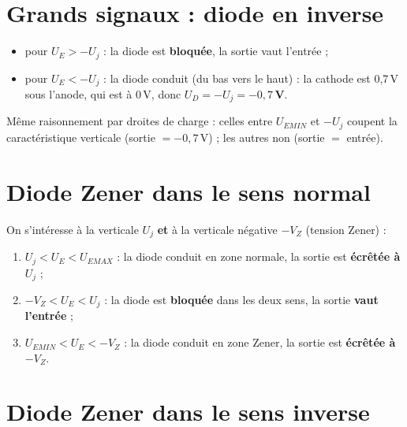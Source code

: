\section{Grands signaux : diode en inverse}


\begin{propbox}[title={Diode montée en inverse (la caractéristique pivote de 180\ensuremath{^\circ})}]
\begin{itemize}
  \item pour $U_E > -U_j$ : la diode est \textbf{bloquée}, la sortie vaut l'entrée ;
  \item pour $U_E < -U_j$ : la diode conduit (du bas vers le haut) : la cathode est 0,7\,V
        sous l'anode, qui est à 0\,V, donc \textbf{$U_D = -U_j = -0{,}7$\,V}.
\end{itemize}
Même raisonnement par droites de charge : celles entre $U_{EMIN}$ et $-U_j$ coupent la
caractéristique verticale (sortie $= -0{,}7$\,V) ; les autres non (sortie $=$ entrée).
\end{propbox}

\section{Diode Zener dans le sens normal}


\begin{thmbox}[title={Zener, sens normal : trois zones}]
On s'intéresse à la verticale $U_j$ \textbf{et} à la verticale négative $-V_Z$ (tension
Zener) :
\begin{enumerate}
  \item $U_j < U_E < U_{EMAX}$ : la diode conduit en zone \og normale\fg{}, la sortie est
        \textbf{écrêtée à $U_j$} ;
  \item $-V_Z < U_E < U_j$ : la diode est \textbf{bloquée} dans les deux sens, la sortie
        \textbf{vaut l'entrée} ;
  \item $U_{EMIN} < U_E < -V_Z$ : la diode conduit en zone \og Zener\fg{}, la sortie est
        \textbf{écrêtée à $-V_Z$}.
\end{enumerate}
\end{thmbox}

\section{Diode Zener dans le sens inverse}

